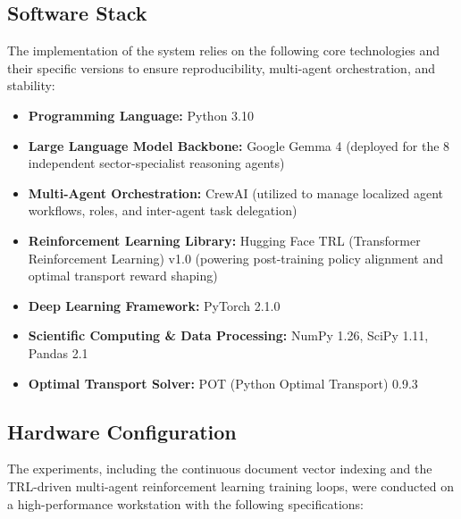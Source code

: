 \documentclass[12pt,a4paper,oneside]{report}
\theoremstyle{definition}
\theoremstyle{remark}
\begin{document}
\subsection{Software Stack}
The implementation of the system relies on the following core technologies and their specific versions to ensure reproducibility, multi-agent orchestration, and stability:
\begin{itemize}
    \item \textbf{Programming Language:} Python 3.10
    \item \textbf{Large Language Model Backbone:} Google Gemma 4 (deployed for the 8 independent sector-specialist reasoning agents)
    \item \textbf{Multi-Agent Orchestration:} CrewAI (utilized to manage localized agent workflows, roles, and inter-agent task delegation)
    \item \textbf{Reinforcement Learning Library:} Hugging Face TRL (Transformer Reinforcement Learning) v1.0 (powering post-training policy alignment and optimal transport reward shaping)
    \item \textbf{Deep Learning Framework:} PyTorch 2.1.0
    \item \textbf{Scientific Computing \& Data Processing:} NumPy 1.26, SciPy 1.11, Pandas 2.1
    \item \textbf{Optimal Transport Solver:} POT (Python Optimal Transport) 0.9.3
\end{itemize}

\subsection{Hardware Configuration}
The experiments, including the continuous document vector indexing and the TRL-driven multi-agent reinforcement learning training loops, were conducted on a high-performance workstation with the following specifications:
\end{document}
